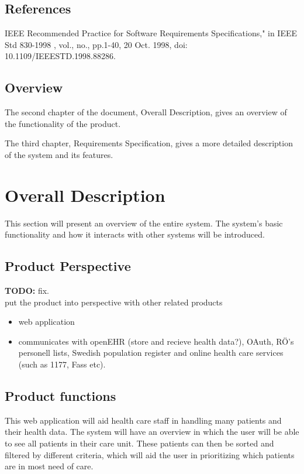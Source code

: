 \documentclass{scrreprt}
\begin{document}
\section{References}
IEEE Recommended Practice for Software Requirements Specifications," in IEEE Std 830-1998 , vol., no., pp.1-40, 20 Oct. 1998, doi: 10.1109/IEEESTD.1998.88286.

\section{Overview}
The second chapter of the document, Overall Description, gives an overview of the functionality of the product.


The third chapter, Requirements Specification, gives a more  detailed description of the system and its features. 

\chapter{Overall Description}
This section will present an overview of the entire system. The system's basic functionality and how it interacts with other systems will be introduced. %

\section{Product Perspective}
\textbf{TODO:} fix. \\ put the product into perspective with other related products
\begin{itemize}
    \item web application
    \item communicates with openEHR (store and recieve health data?), OAuth, RÖ's personell lists, Swedish population register and online health care services (such as 1177, Fass etc).
\end{itemize}


\section{Product functions}
This web application will aid health care staff in handling many patients and their health data. The system will have an overview in which the user will be able to see all patients in their care unit. These patients can then be sorted and filtered by different criteria, which will aid the user in prioritizing which patients are in most need of care. 
\end{document}
